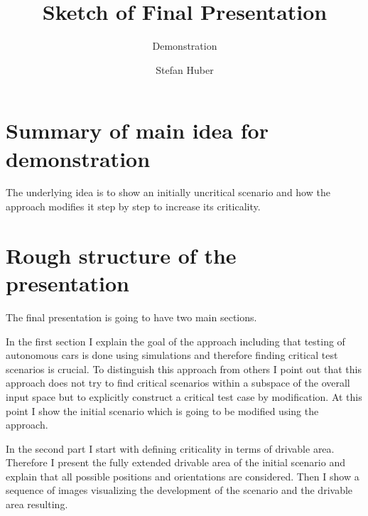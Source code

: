\documentclass{scrartcl}
\title{Sketch of Final Presentation}
\subtitle{Demonstration}
\author{Stefan Huber}
\begin{document}
\maketitle%

\section{Summary of main idea for demonstration}
The underlying idea is to show an initially uncritical scenario and how the approach modifies it step by step to increase its criticality.

\section{Rough structure of the presentation}
The final presentation is going to have two main sections.\par
In the first section I explain the goal of the approach including that testing of autonomous cars is done using simulations and therefore finding critical test scenarios is crucial.
To distinguish this approach from others I point out that this approach does not try to find critical scenarios within a subspace of the overall input space but to explicitly construct a critical test case by modification.
At this point I show the initial scenario which is going to be modified using the approach.\par
In the second part I start with defining criticality in terms of drivable area.
Therefore I present the fully extended drivable area of the initial scenario and explain that all possible positions and orientations are considered.
Then I show a sequence of images visualizing the development of the scenario and the drivable area resulting.
\end{document}
